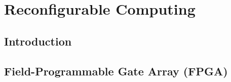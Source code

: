\chapter{Reconfigurable Computing}
\label{ch:reconfigurableComputing}

\section{Introduction}

\section{Field-Programmable Gate Array (FPGA)}
